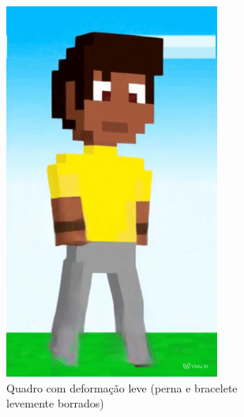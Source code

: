 \begin{figure}[htbp]
\begin{subfigure}{0.32\linewidth}
        \includegraphics[width=0.9\linewidth]{figs/vidu/2leve.png}
        \caption{\small Quadro com deformação leve (perna e bracelete levemente borrados)}
        \label{fig:viduDeformacao2Leve}
    \end{subfigure}
    \begin{subfigure}{0.32\linewidth}
        \centering

\end{subfigure}
\end{figure}
